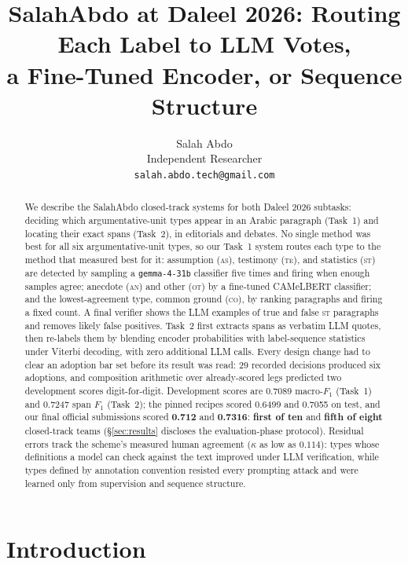 \documentclass[11pt]{article}
\title{SalahAbdo at Daleel 2026: Routing Each Label to LLM Votes,\\
a Fine-Tuned Encoder, or Sequence Structure}
\author{Salah Abdo \\
  Independent Researcher \\
  \texttt{salah.abdo.tech@gmail.com}}
\newcommand{\lab}[1]{\textsc{#1}}
\newcommand{\co}{\lab{co}}
\newcommand{\as}{\lab{as}}
\newcommand{\te}{\lab{te}}
\newcommand{\st}{\lab{st}}
\newcommand{\an}{\lab{an}}
\newcommand{\ot}{\lab{ot}}
\begin{document}
\maketitle

\begin{abstract}
We describe the SalahAbdo closed-track systems for both Daleel 2026
subtasks: deciding which argumentative-unit types appear in an Arabic
paragraph (Task~1) and locating their exact spans (Task~2), in
editorials and debates. No single method was best for all six
argumentative-unit types, so our Task~1 system routes each type to the
method that measured best for it: assumption (\as), testimony (\te),
and statistics (\st) are detected by sampling a \texttt{gemma-4-31b}
classifier five times and firing when enough samples agree; anecdote
(\an) and other (\ot) by a fine-tuned CAMeLBERT classifier; and the
lowest-agreement type, common ground (\co), by ranking paragraphs and
firing a fixed count. A final verifier shows the LLM examples of true and false
\st{} paragraphs and removes likely false positives. Task~2 first
extracts spans as verbatim LLM quotes, then re-labels them by blending
encoder probabilities with label-sequence statistics under Viterbi
decoding, with zero additional LLM calls. Every design change had to
clear an adoption bar set before its result was read: 29 recorded
decisions produced six adoptions, and composition arithmetic over
already-scored legs predicted two development scores digit-for-digit. Development scores
are 0.7089 macro-$F_1$ (Task~1) and 0.7247 span $F_1$ (Task~2); the
pinned recipes scored 0.6499 and 0.7055 on test, and our final official
submissions scored \textbf{0.712} and \textbf{0.7316}: \textbf{first of
ten} and \textbf{fifth of eight} closed-track teams
(\S\ref{sec:results} discloses the evaluation-phase protocol).
Residual errors track the scheme's measured
human agreement ($\kappa$ as low as $0.114$): types whose definitions a
model can check against the text improved under LLM verification, while
types defined by annotation convention resisted every prompting attack
and were learned only from supervision and sequence structure.
\end{abstract}

\section{Introduction}
\label{sec:intro}
\end{document}
